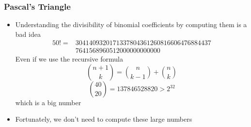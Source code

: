 \documentclass{beamer}
\begin{document}
\begin{frame}
    \frametitle{Pascal's Triangle}
    \begin{itemize}
        \item
        Understanding the divisibility of binomial coefficients by computing them is a bad idea
        \begin{align*}
            50! = &3041409320171337804361260816606476884437\\
            &7641568960512000000000000   
        \end{align*}
        Even if we use the recursive formula 
        \begin{equation*}
            \binom{n+1}{k}= \binom{n}{k-1} + \binom{n}{k}
        \end{equation*}
        \begin{equation*}
            \binom{40}{20} = 137846528820 > 2^{32}
        \end{equation*}
        which is a big number
        \item Fortunately, we don't need to compute these large numbers
        \end{itemize}
    
\end{frame}
\end{document}
